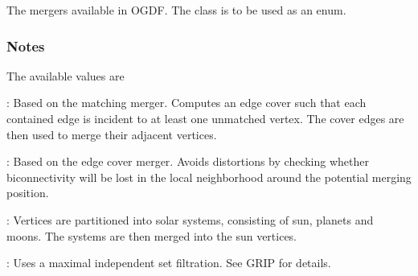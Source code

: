 \documentclass[letterpaper,10pt,english]{sphinxmanual}
\begin{document}
\begin{fulllineitems}
\label{\detokenize{documentation:tmap.Merger}}
The mergers available in OGDF. The class is to be used as an enum.
\subsubsection*{Notes}

The available values are

: Based on the matching merger. Computes an edge cover such that each contained edge is incident to at least one unmatched vertex. The cover edges are then used to merge their adjacent vertices.

: Based on the edge cover merger. Avoids distortions by checking whether biconnectivity will be lost in the local neighborhood around the potential merging position.

: Vertices are partitioned into solar systems, consisting of sun, planets and moons. The systems are then merged into the sun vertices.

: Uses a maximal independent set filtration. See GRIP for details.

\end{fulllineitems}

\end{document}
